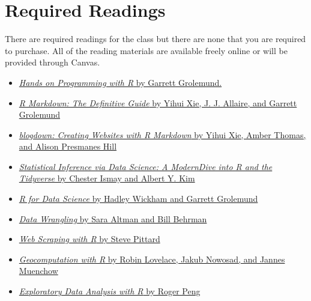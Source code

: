 \documentclass[11pt]{article}
\begin{document}
\section{Required Readings}
There are required readings for the class but there are none that you are required to purchase. All of the reading materials are available freely online or will be provided through Canvas. 

\begin{itemize}
\item \href{https://rstudio-education.github.io/hopr/index.html}{\textit{Hands on Programming with R} by Garrett Grolemund.}
\item  \href{https://bookdown.org/yihui/rmarkdown/}{\textit{R Markdown: The Definitive Guide} by Yihui Xie, J. J. Allaire, and Garrett Grolemund}
\item  \href{https://bookdown.org/yihui/blogdown/}{\textit{blogdown: Creating Websites with R Markdown} by Yihui Xie, Amber Thomas, and Alison Presmanes Hill}
\item \href{https://moderndive.com/index.html}{\textit{Statistical Inference via Data Science: A ModernDive into R and the Tidyverse} by Chester Ismay and Albert Y. Kim}
\item \href{https://r4ds.had.co.nz/index.html}{\textit{R for Data Science} by Hadley Wickham and Garrett Grolemund}
\item \href{https://dcl-wrangle.stanford.edu/index.html}{\textit{Data Wrangling} by Sara Altman and Bill Behrman}
\item \href{https://steviep42.github.io/webscraping/book/}{\textit{Web Scraping with R} by Steve Pittard}
\item \href{https://geocompr.robinlovelace.net/}{\textit{Geocomputation with R} by Robin Lovelace, Jakub Nowosad, and Jannes Muenchow}
\item \href{https://bookdown.org/rdpeng/exdata/}{\textit{Exploratory Data Analysis with R} by Roger Peng}
\end{itemize}
\end{document}
